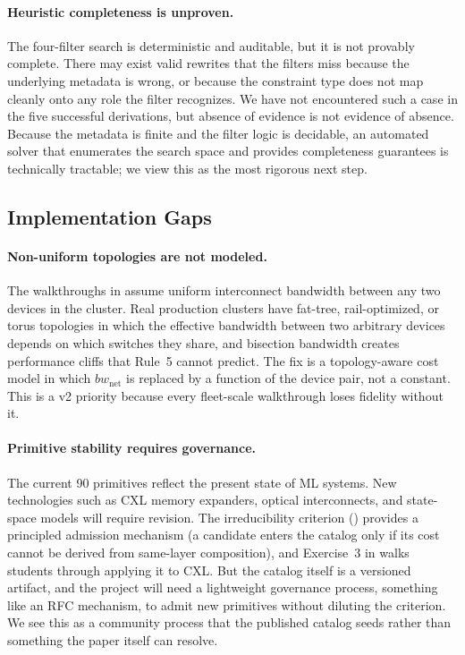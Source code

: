 \documentclass[10pt,twocolumn]{article}
\begin{document}
\paragraph{Heuristic completeness is unproven.} The four-filter search is deterministic and auditable, but it is not provably complete. There may exist valid rewrites that the filters miss because the underlying metadata is wrong, or because the constraint type does not map cleanly onto any role the filter recognizes. We have not encountered such a case in the five successful derivations, but absence of evidence is not evidence of absence. Because the metadata is finite and the filter logic is decidable, an automated solver that enumerates the search space and provides completeness guarantees is technically tractable; we view this as the most rigorous next step.

\subsection{Implementation Gaps}


\paragraph{Non-uniform topologies are not modeled.} The walkthroughs in  assume uniform interconnect bandwidth between any two devices in the cluster. Real production clusters have fat-tree, rail-optimized, or torus topologies in which the effective bandwidth between two arbitrary devices depends on which switches they share, and bisection bandwidth creates performance cliffs that Rule~5 cannot predict. The fix is a topology-aware cost model in which $bw_{\text{net}}$ is replaced by a function of the device pair, not a constant. This is a v2 priority because every fleet-scale walkthrough loses fidelity without it.

\paragraph{Primitive stability requires governance.} The current 90 primitives reflect the present state of ML systems. New technologies such as CXL memory expanders, optical interconnects, and state-space models will require revision. The irreducibility criterion () provides a principled admission mechanism (a candidate enters the catalog only if its cost cannot be derived from same-layer composition), and Exercise~3 in  walks students through applying it to CXL. But the catalog itself is a versioned artifact, and the project will need a lightweight governance process, something like an RFC mechanism, to admit new primitives without diluting the criterion. We see this as a community process that the published catalog seeds rather than something the paper itself can resolve.
\end{document}
